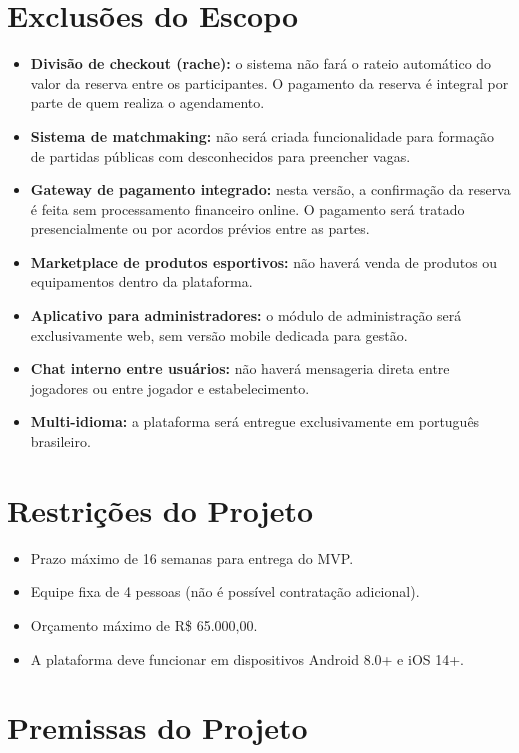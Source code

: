 \documentclass[12pt,a4paper,oneside]{report}
\begin{document}
\section{Exclusões do Escopo}

\begin{itemize}
    \item \textbf{Divisão de checkout (rache):} o sistema não fará o rateio automático do valor da reserva entre os participantes. O pagamento da reserva é integral por parte de quem realiza o agendamento.
    \item \textbf{Sistema de matchmaking:} não será criada funcionalidade para formação de partidas públicas com desconhecidos para preencher vagas.
    \item \textbf{Gateway de pagamento integrado:} nesta versão, a confirmação da reserva é feita sem processamento financeiro online. O pagamento será tratado presencialmente ou por acordos prévios entre as partes.
    \item \textbf{Marketplace de produtos esportivos:} não haverá venda de produtos ou equipamentos dentro da plataforma.
    \item \textbf{Aplicativo para administradores:} o módulo de administração será exclusivamente web, sem versão mobile dedicada para gestão.
    \item \textbf{Chat interno entre usuários:} não haverá mensageria direta entre jogadores ou entre jogador e estabelecimento.
    \item \textbf{Multi-idioma:} a plataforma será entregue exclusivamente em português brasileiro.
\end{itemize}

\section{Restrições do Projeto}

\begin{itemize}
    \item Prazo máximo de 16 semanas para entrega do MVP.
    \item Equipe fixa de 4 pessoas (não é possível contratação adicional).
    \item Orçamento máximo de R\$ 65.000,00.
    \item A plataforma deve funcionar em dispositivos Android 8.0+ e iOS 14+.
\end{itemize}

\section{Premissas do Projeto}
\end{document}
